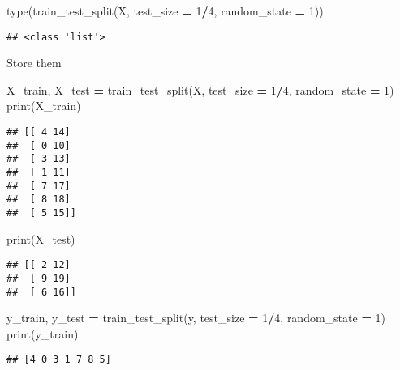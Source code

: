 \documentclass[
]{book}
\newenvironment{Shaded}{\begin{snugshade}}{\end{snugshade}}
\newcommand{\BuiltInTok}[1]{#1}
\newcommand{\DecValTok}[1]{\textcolor[rgb]{0.00,0.00,0.81}{#1}}
\newcommand{\NormalTok}[1]{#1}
\newcommand{\OperatorTok}[1]{\textcolor[rgb]{0.81,0.36,0.00}{\textbf{#1}}}
\begin{document}
\begin{Shaded}
\begin{Highlighting}[]
\BuiltInTok{type}\NormalTok{(train\_test\_split(X, test\_size }\OperatorTok{=} \DecValTok{1}\OperatorTok{/}\DecValTok{4}\NormalTok{, random\_state }\OperatorTok{=} \DecValTok{1}\NormalTok{))}
\end{Highlighting}
\end{Shaded}

\begin{verbatim}
## <class 'list'>
\end{verbatim}

Store them

\begin{Shaded}
\begin{Highlighting}[]
\NormalTok{X\_train, X\_test }\OperatorTok{=}\NormalTok{ train\_test\_split(X, test\_size }\OperatorTok{=} \DecValTok{1}\OperatorTok{/}\DecValTok{4}\NormalTok{, random\_state }\OperatorTok{=} \DecValTok{1}\NormalTok{)}
\BuiltInTok{print}\NormalTok{(X\_train)}
\end{Highlighting}
\end{Shaded}

\begin{verbatim}
## [[ 4 14]
##  [ 0 10]
##  [ 3 13]
##  [ 1 11]
##  [ 7 17]
##  [ 8 18]
##  [ 5 15]]
\end{verbatim}

\begin{Shaded}
\begin{Highlighting}[]
\BuiltInTok{print}\NormalTok{(X\_test)}
\end{Highlighting}
\end{Shaded}

\begin{verbatim}
## [[ 2 12]
##  [ 9 19]
##  [ 6 16]]
\end{verbatim}

\begin{Shaded}
\begin{Highlighting}[]
\NormalTok{y\_train, y\_test }\OperatorTok{=}\NormalTok{ train\_test\_split(y, test\_size }\OperatorTok{=} \DecValTok{1}\OperatorTok{/}\DecValTok{4}\NormalTok{, random\_state }\OperatorTok{=} \DecValTok{1}\NormalTok{)}
\BuiltInTok{print}\NormalTok{(y\_train)}
\end{Highlighting}
\end{Shaded}

\begin{verbatim}
## [4 0 3 1 7 8 5]
\end{verbatim}
\end{document}
